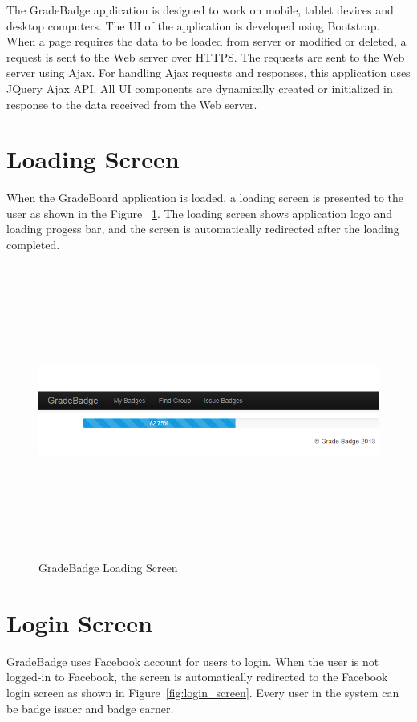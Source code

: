 
The GradeBadge application is designed to work on mobile, tablet devices and desktop computers. The UI of the application is developed using Bootstrap. When a page requires the data to be loaded from server or modified or deleted, a request is sent to the Web server over  HTTPS. The requests are sent to the Web server using Ajax. For handling Ajax requests and responses, this application uses JQuery Ajax API. All UI components are dynamically created or initialized in response to the data received from the Web server.

\newpage
\section{Loading Screen}
When the GradeBoard application is loaded, a loading screen is presented to the user as shown in the Figure ~\ref{fig:loading_screen}. The loading screen shows application logo and loading progess bar, and the screen is automatically redirected after the loading completed. 

\vspace{3em}
\begin{figure}[H]
\begin{center}
\includegraphics[height=3.8in,width=5.5in]{images/loading-screen.jpg}
\caption{GradeBadge Loading Screen}
\label{fig:loading_screen}
\end{center}
\end{figure}

\newpage
\section{Login Screen}
GradeBadge uses Facebook account for users to login. When the user is not logged-in to Facebook, the screen is automatically redirected to the Facebook login screen as shown in Figure~\ref{fig:login_screen}. Every user in the system can be badge issuer and badge earner.


